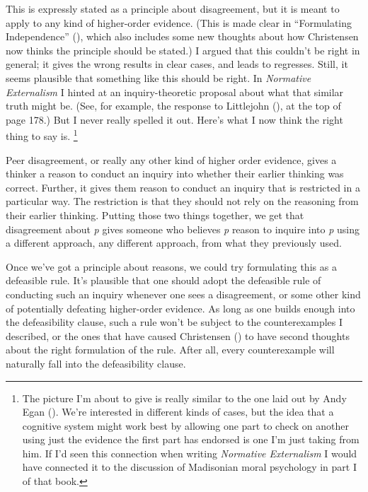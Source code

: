 \documentclass[
  10pt,
  letterpaper,
  twoside]{scrbook}
\begin{document}
This is expressly stated as a principle about disagreement, but it is
meant to apply to any kind of higher-order evidence. (This is made clear
in ``Formulating Independence''
(), which also includes
some new thoughts about how Christensen now thinks the principle should
be stated.) I argued that this couldn't be right in general; it gives
the wrong results in clear cases, and leads to regresses. Still, it
seems plausible that something like this should be right. In
\emph{Normative Externalism} I hinted at an inquiry-theoretic proposal
about what that similar truth might be. (See, for example, the response
to Littlejohn (), at the top of page
178.) But I never really spelled it out. Here's what I now think the
right thing to say is. \footnote{The picture I'm about to give is really
  similar to the one laid out by Andy Egan
  (). We're interested in different kinds
  of cases, but the idea that a cognitive system might work best by
  allowing one part to check on another using just the evidence the
  first part has endorsed is one I'm just taking from him. If I'd seen
  this connection when writing \emph{Normative Externalism} I would have
  connected it to the discussion of Madisonian moral psychology in part
  I of that book.}

Peer disagreement, or really any other kind of higher order evidence,
gives a thinker a reason to conduct an inquiry into whether their
earlier thinking was correct. Further, it gives them reason to conduct
an inquiry that is restricted in a particular way. The restriction is
that they should not rely on the reasoning from their earlier thinking.
Putting those two things together, we get that disagreement about
\emph{p} gives someone who believes \emph{p} reason to inquire into
\emph{p} using a different approach, any different approach, from what
they previously used.

Once we've got a principle about reasons, we could try formulating this
as a defeasible rule. It's plausible that one should adopt the
defeasible rule of conducting such an inquiry whenever one sees a
disagreement, or some other kind of potentially defeating higher-order
evidence. As long as one builds enough into the defeasibility clause,
such a rule won't be subject to the counterexamples I described, or the
ones that have caused Christensen ()
to have second thoughts about the right formulation of the rule. After
all, every counterexample will naturally fall into the defeasibility
clause.
\end{document}
